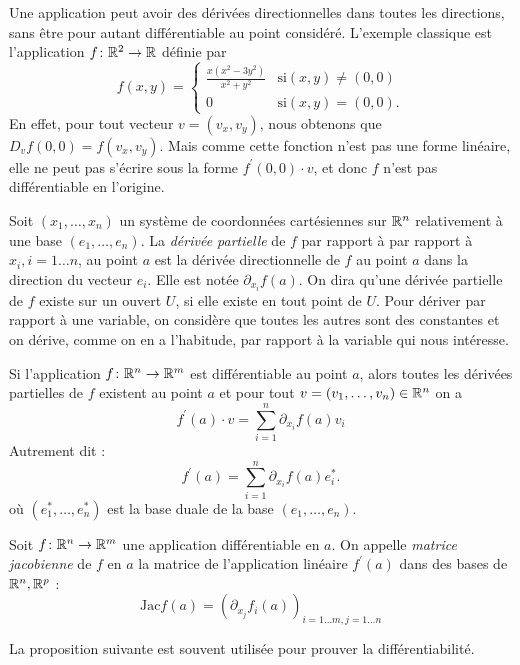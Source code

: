 Une application peut avoir des dérivées directionnelles dans toutes les directions, sans être pour autant différentiable au point considéré.
 L'exemple classique est l'application $f \colon \mathbb R^2 \to \mathbb R$ définie par
\[f(x,y) = \begin{cases} \frac{x(x^2-3 y^2)}{x^2 + y^2} & \text{si} (x,y) \neq (0,0) \\
0 &  \text{si} (x,y)= (0,0).
\end{cases}\]
En effet, pour tout vecteur $v=(v_x, v_y)$, nous obtenons que $D_v f(0,0) = f(v_x,v_y)$. Mais comme cette fonction n'est pas une forme linéaire, elle ne peut pas s'écrire sous la forme $f^\prime(0,0) \cdot v$, et donc $f$ n'est pas différentiable en l'origine. 

Soit $(x_1,\dots,x_n)$ un système de coordonnées cartésiennes sur $\mathbb R^n$ relativement à une base $(e_1,\dots,e_n).$  
  La \textit{dérivée partielle} de $f$ par rapport à par rapport à $x_i,i=1\dots n$, au point $a$ 
  est la dérivée directionnelle de $f$ au point $a$ dans la direction du vecteur $e_i$.
   Elle est notée $\partial_{x_i} f (a)$. 
On dira qu'une dérivée partielle de $f$ existe sur un ouvert $U$, si elle existe en tout point de $U$.
 Pour dériver par rapport à une variable, on considère que toutes les autres sont des constantes et on dérive, comme on en a l'habitude,
  par rapport à la variable qui nous intéresse.

\begin{prop}
Si l'application $f \colon \mathbb R^n \to \mathbb R^m$ est différentiable au point $a$, alors toutes les dérivées partielles de $f$ existent
 au point $a$ et pour tout $v = (v_1,\dots, v_n) \in \mathbb R^n$ on a
\[f^\prime (a) \cdot v = \sum_{i=1}^n \partial_{x_i}f(a) v_i\]
Autrement dit :
\[f^\prime (a) = \sum_{i=1}^n \partial_{x_i}f(a) e^\ast_i .\]
où $(e_1^\ast,\dots, e_n^\ast)$ est la base duale de la base $(e_1,\dots,e_n).$
\end{prop}
\begin{definition}	Soit $f \colon \mathbb R^n \to \mathbb R^m$ une application différentiable en $a$. 
  On appelle \textit{matrice jacobienne} de $f$ en $a$ la matrice de l'application linéaire $f^\prime(a)$ 
  dans des bases de $\mathbb R^n, \mathbb R^p$ :
\[\text{Jac} f(a) = \left( \partial_{x_j} f_i(a) \right)_{i=1\dots  m, j=1 \dots n}
\]
\end{definition}

La proposition suivante est souvent utilisée pour prouver la différentiabilité. 

